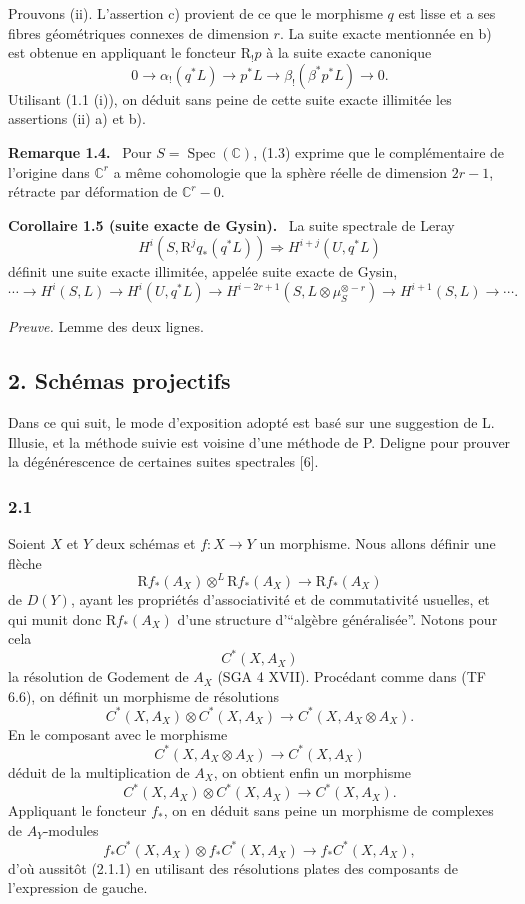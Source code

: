 \documentclass[11pt]{article}
\newenvironment{statement}[1]{\par\medskip\noindent\textbf{#1.}\ }{\par\medskip}
\newcommand{\R}{\mathrm{R}}\newcommand{\RHomCore}{\mathrm{RHom}}
\providecommand{\R}{\mathrm R}
\begin{document}
Prouvons (ii). L'assertion c) provient de ce que le morphisme $q$ est lisse et a ses fibres géométriques connexes de dimension $r$. La suite exacte mentionnée en b) est obtenue en appliquant le foncteur $\R_!p$ à la suite exacte canonique
\[
0\longrightarrow \alpha_!(q^*L)\longrightarrow p^*L\longrightarrow \beta_!(\beta^*p^*L)\longrightarrow 0.
\]
Utilisant (1.1 (i)), on déduit sans peine de cette suite exacte illimitée les assertions (ii) a) et b).

\begin{statement}{Remarque 1.4}
Pour $S=\operatorname{Spec}(\mathbb C)$, (1.3) exprime que le complémentaire de l'origine dans $\mathbb C^r$ a même cohomologie que la sphère réelle de dimension $2r-1$, rétracte par déformation de $\mathbb C^r-0$.
\end{statement}

\begin{statement}{Corollaire 1.5 (suite exacte de Gysin)}
La suite spectrale de Leray
\[
H^i(S,\R^j q_*(q^*L))\Rightarrow H^{i+j}(U,q^*L)
\]
définit une suite exacte illimitée, appelée suite exacte de Gysin,
\[
\cdots\longrightarrow H^i(S,L)\longrightarrow H^i(U,q^*L)\longrightarrow
H^{i-2r+1}(S,L\otimes\mu_S^{\otimes -r})\longrightarrow H^{i+1}(S,L)\longrightarrow\cdots.
\]
\end{statement}

\emph{Preuve.} Lemme des deux lignes.

\subsection*{2. Schémas projectifs}

Dans ce qui suit, le mode d'exposition adopté est basé sur une suggestion de L. Illusie, et la méthode suivie est voisine d'une méthode de P. Deligne pour prouver la dégénérescence de certaines suites spectrales [6].

\subsubsection*{2.1}
Soient $X$ et $Y$ deux schémas et $f:X\to Y$ un morphisme. Nous allons définir une flèche
\[
\R f_*(A_X)\otimes^L \R f_*(A_X)\longrightarrow \R f_*(A_X)
\tag{2.1.1}
\]
de $D(Y)$, ayant les propriétés d'associativité et de commutativité usuelles, et qui munit donc $\R f_*(A_X)$ d'une structure d'``algèbre généralisée''. Notons pour cela
\[
C^*(X,A_X)
\]
la résolution de Godement de $A_X$ (SGA 4 XVII). Procédant comme dans (TF 6.6), on définit un morphisme de résolutions
\[
C^*(X,A_X)\otimes C^*(X,A_X)\longrightarrow C^*(X,A_X\otimes A_X).
\]
En le composant avec le morphisme
\[
C^*(X,A_X\otimes A_X)\longrightarrow C^*(X,A_X)
\]
déduit de la multiplication de $A_X$, on obtient enfin un morphisme
\[
C^*(X,A_X)\otimes C^*(X,A_X)\longrightarrow C^*(X,A_X).
\tag{2.1.2}
\]
Appliquant le foncteur $f_*$, on en déduit sans peine un morphisme de complexes de $A_Y$-modules
\[
f_*C^*(X,A_X)\otimes f_*C^*(X,A_X)\longrightarrow f_*C^*(X,A_X),
\]
d'où aussitôt (2.1.1) en utilisant des résolutions plates des composants de l'expression de gauche.
\end{document}
